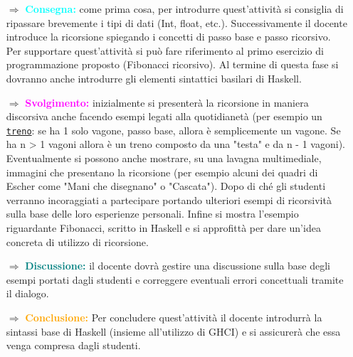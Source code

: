\begin{itemize}
    \item [$\Rightarrow$] \textbf{\textcolor{cyan}{Consegna:}} come prima cosa, per introdurre
    quest'attività si consiglia di ripassare brevemente i tipi di dati (Int, float, etc.). 
    Successivamente il docente introduce la ricorsione spiegando i concetti di passo base e passo
    ricorsivo. Per supportare quest'attività si può fare riferimento al primo esercizio di programmazione proposto
    (Fibonacci ricorsivo). Al termine di questa fase si dovranno anche introdurre gli elementi sintattici basilari di Haskell.
    \item [$\Rightarrow$] \textbf{\textcolor{magenta}{Svolgimento:}} inizialmente si presenterà la
    ricorsione in maniera discorsiva anche facendo esempi legati alla quotidianetà 
    (per esempio un \texttt{\href{https://www.researchgate.net/publication/309578166_Percorso_didattico_sulla_ricorsione_dalla_natura_al_coding}{treno}}:
    se ha 1 solo vagone, passo base, allora è semplicemente un vagone. Se ha n > 1 vagoni allora
    è un treno composto da una "testa" e da n - 1 vagoni). Eventualmente si possono anche mostrare,
    su una lavagna multimediale, immagini che presentano la ricorsione (per esempio alcuni dei quadri di Escher
    come "Mani che disegnano" o "Cascata"). Dopo di ché gli studenti verranno incoraggiati a partecipare portando
    ulteriori esempi di ricorsività sulla base delle loro esperienze personali.
     Infine si mostra l'esempio riguardante Fibonacci, scritto in Haskell
    e si approfittà per dare un'idea concreta di utilizzo di ricorsione.
    \item [$\Rightarrow$] \textbf{\textcolor{teal}{Discussione:}} il docente dovrà gestire una discussione
    sulla base degli esempi portati dagli studenti e correggere eventuali errori concettuali
    tramite il dialogo. 
    \item [$\Rightarrow$] \textbf{\textcolor{orange}{Conclusione:}} Per concludere quest'attività il docente introdurrà
    la sintassi base di Haskell (insieme all'utilizzo di GHCI) e si assicurerà che essa venga compresa dagli studenti. 
\end{itemize}


